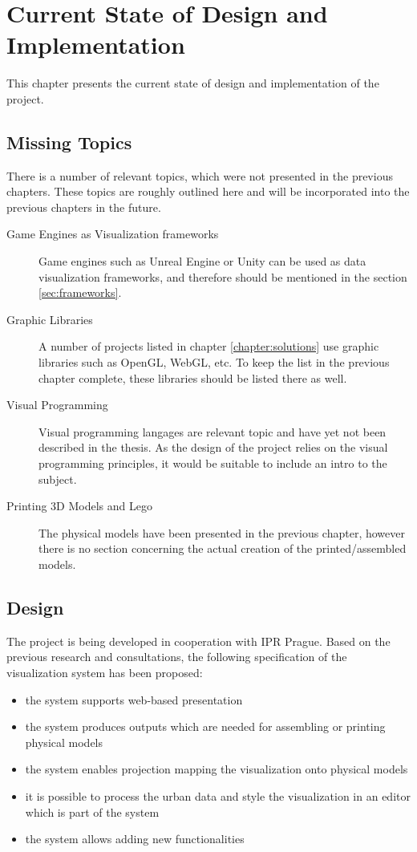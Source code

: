 \chapter{Current State of Design and Implementation}
This chapter presents the current state of design and implementation of the project. 

\section{Missing Topics}
There is a number of relevant topics, which were not presented in the previous chapters. These topics are roughly outlined here and will be incorporated into the previous chapters in the future.
\begin{description}
    \item[Game Engines as Visualization frameworks] Game engines such as Unreal Engine or Unity can be used as data visualization frameworks, and therefore should be mentioned in the section \ref{sec:frameworks}.
    \item[Graphic Libraries] A number of projects listed in chapter \ref{chapter:solutions} use graphic libraries such as OpenGL, WebGL, etc. To keep the list in the previous chapter complete, these libraries should be listed there as well.
    \item[Visual Programming] Visual programming langages are relevant topic and have yet not been described in the thesis. As the design of the project relies on the visual programming principles, it would be suitable to include an intro to the subject.
    \item[Printing 3D Models and Lego] The physical models have been presented in the previous chapter, however there is no section concerning the actual creation of the printed/assembled models.  
\end{description}

\section{Design}
The project is being developed in cooperation with IPR Prague. Based on the previous research and consultations, the following specification of the visualization system has been proposed:
\begin{itemize}
    \item the system supports web-based presentation
    \item the system produces outputs which are needed for assembling or printing physical models  
    \item the system enables projection mapping the visualization onto physical models
    \item it is possible to process the urban data and style the visualization in an editor which is part of the system
    \item the system allows adding new functionalities
\end{itemize}







